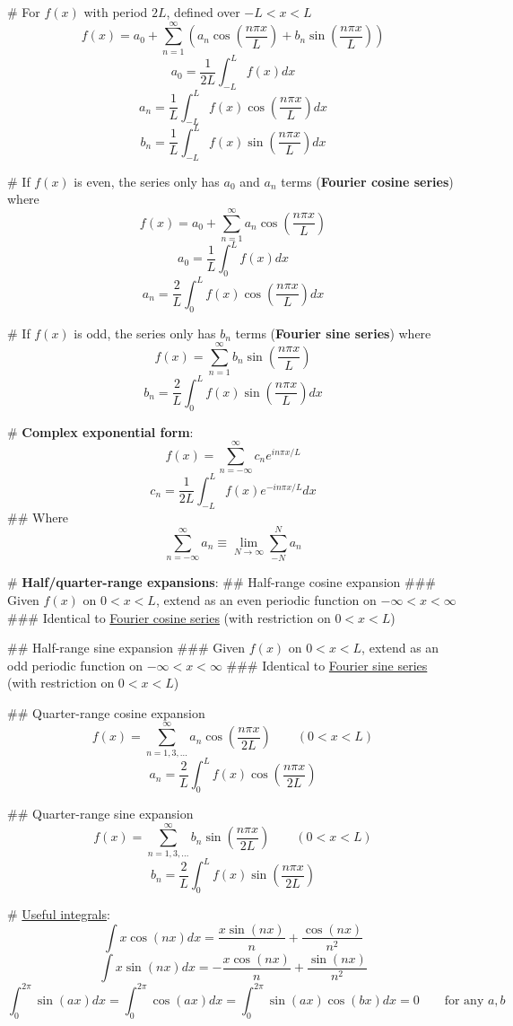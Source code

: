\documentclass[11pt, oneside]{article}
\begin{document}
# For $f(x)$ with period $2L$, defined over $-L < x < L$
\[ f(x) = a_0 + \sum_{n=1}^\infty \left(a_n \cos\left(\frac{n\pi x}{L}\right) + b_n \sin\left(\frac{n\pi x}{L}\right) \right) \]
\[ a_0 = \frac{1}{2L} \int_{-L}^L f(x)dx \]
\[ a_n = \frac{1}{L} \int_{-L}^L f(x) \cos\left(\frac{n\pi x}{L}\right)dx \]
\[ b_n = \frac{1}{L} \int_{-L}^L f(x) \sin\left(\frac{n\pi x}{L}\right)dx \]

# If $f(x)$ is even, the series only has $a_0$ and $a_n$ terms (\textbf{Fourier cosine series}) where
\[ f(x) = a_0 + \sum_{n=1}^\infty a_n \cos\left(\frac{n\pi x}{L}\right) \]
\[ a_0 = \frac{1}{L} \int_0^L f(x)dx \]
\[ a_n = \frac{2}{L} \int_0^L f(x) \cos\left(\frac{n\pi x}{L}\right)dx \]

# If $f(x)$ is odd, the series only has $b_n$ terms (\textbf{Fourier sine series}) where
\[ f(x) = \sum_{n=1}^\infty b_n \sin\left(\frac{n\pi x}{L}\right) \]
\[ b_n = \frac{2}{L} \int_0^L f(x) \sin\left(\frac{n\pi x}{L}\right)dx \]

# \textbf{Complex exponential form}:
\[ f(x) = \sum_{n=-\infty}^\infty c_n e^{in\pi x/L} \]
\[ c_n = \frac{1}{2L} \int_{-L}^L f(x)e^{-in\pi x/L}dx \]
## Where
\[ \sum_{n=-\infty}^\infty a_n \equiv \lim_{N \rightarrow \infty} \sum_{-N}^N a_n \]

# \textbf{Half/quarter-range expansions}:
## Half-range cosine expansion
### Given $f(x)$ on $0 < x < L$, extend as an even periodic function on $-\infty < x < \infty$
### Identical to \underline{Fourier cosine series} (with restriction on $0 < x < L$)

## Half-range sine expansion
### Given $f(x)$ on $0 < x < L$, extend as an odd periodic function on $-\infty < x < \infty$
### Identical to \underline{Fourier sine series} (with restriction on $0 < x < L$)

## Quarter-range cosine expansion
\[ f(x) = \sum_{n=1,3,\ldots}^\infty a_n \cos\left(\frac{n\pi x}{2L}\right) \qquad (0 < x < L) \]
\[ a_n = \frac{2}{L} \int_0^L f(x)\cos\left(\frac{n\pi x}{2L}\right) \]

## Quarter-range sine expansion
\[ f(x) = \sum_{n=1,3,\ldots}^\infty b_n \sin\left(\frac{n\pi x}{2L}\right) \qquad (0 < x < L) \]
\[ b_n = \frac{2}{L} \int_0^L f(x)\sin\left(\frac{n\pi x}{2L}\right) \]

# \underline{Useful integrals}:
\[ \int x\cos(nx) dx = \frac{x\sin(nx)}{n} + \frac{\cos(nx)}{n^2} \]
\[ \int x\sin(nx) dx = -\frac{x\cos(nx)}{n} + \frac{\sin(nx)}{n^2} \]
\[ \int_0^{2\pi} \sin(ax)dx = \int_0^{2\pi} \cos(ax)dx = \int_0^{2\pi} \sin(ax)\cos(bx)dx = 0 \qquad \text{for any } a, b \]
\end{document}
